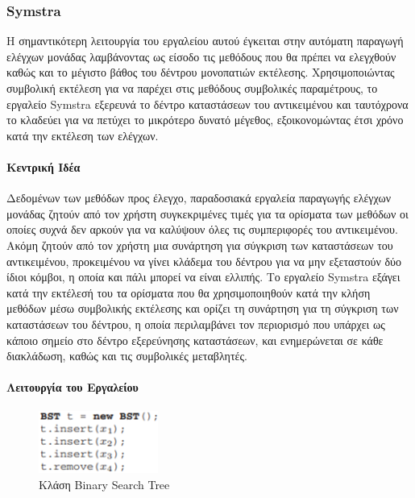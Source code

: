 \documentclass[12pt]{article}
\begin{document}
\subsubsection{Symstra} 

Η σημαντικότερη λειτουργία του εργαλείου αυτού έγκειται στην αυτόματη παραγωγή ελέγχων μονάδας λαμβάνοντας ως είσοδο τις μεθόδους που θα πρέπει να ελεγχθούν καθώς και το μέγιστο βάθος του δέντρου μονοπατιών εκτέλεσης. Χρησιμοποιώντας συμβολική εκτέλεση για να παρέχει στις μεθόδους συμβολικές παραμέτρους, το εργαλείο Symstra εξερευνά το δέντρο καταστάσεων του αντικειμένου και ταυτόχρονα το κλαδεύει για να πετύχει το μικρότερο δυνατό μέγεθος, εξοικονομώντας έτσι χρόνο κατά την εκτέλεση των ελέγχων. \cite{tao}

\paragraph{Κεντρική Ιδέα}

Δεδομένων των μεθόδων προς έλεγχο, παραδοσιακά εργαλεία παραγωγής ελέγχων μονάδας ζητούν από τον χρήστη συγκεκριμένες τιμές για τα ορίσματα των μεθόδων οι οποίες συχνά δεν αρκούν για να καλύψουν όλες τις συμπεριφορές του αντικειμένου. Ακόμη ζητούν από τον χρήστη μια συνάρτηση για σύγκριση των καταστάσεων του αντικειμένου, προκειμένου να γίνει κλάδεμα του δέντρου για να μην εξεταστούν δύο ίδιοι κόμβοι, η οποία και πάλι μπορεί να είναι ελλιπής. Το εργαλείο Symstra εξάγει κατά την εκτέλεσή του τα ορίσματα που θα χρησιμοποιηθούν κατά την κλήση μεθόδων μέσω συμβολικής εκτέλεσης και ορίζει τη συνάρτηση για τη σύγκριση των καταστάσεων του δέντρου, η οποία περιλαμβάνει τον περιορισμό που υπάρχει ως κάποιο σημείο στο δέντρο εξερεύνησης καταστάσεων, και ενημερώνεται σε κάθε διακλάδωση, καθώς και τις συμβολικές μεταβλητές.

\paragraph{Λειτουργία του Εργαλείου}

\begin{figure}
\centering
    \includegraphics[width=0.35\textwidth]{bst_class.png}
    \caption{Κλάση Binary Search Tree}
    \label{fig:bst}
\end{figure}
\end{document}
